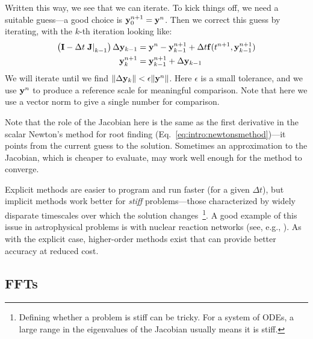 Written this way, we see that we can iterate.  To kick things off, we need
a suitable guess---a good choice is ${\bf y}^{n+1}_0 = {\bf y}^n$.   Then
we correct this guess by iterating, with the $k$-th iteration looking like:
\begin{align}
  \left ({\bf I} - \Delta t \left . {\bf J} \right |_{k-1} \right ) \Delta {\bf y}_{k-1} &=
        {\bf y}^n - {\bf y}_{k-1}^{n+1} + \Delta t {\bf f}(t^{n+1}, {\bf y}^{n+1}_{k-1}) \\
  {\bf y}^{n+1}_k &= {\bf y}^{n+1}_{k-1} + \Delta {\bf y}_{k-1}
\end{align}
We will iterate until we find $\| \Delta {\bf y}_k\| < \epsilon \|
{\bf y}^n \|$.  Here $\epsilon$ is a small tolerance, and we use ${\bf
  y}^n$ to produce a reference scale for meaningful comparison.  Note
that here we use a vector norm to give a single number for comparison.

Note that the role of the Jacobian here is the same as the first
derivative in the scalar Newton's method for root finding
(Eq.~\ref{eq:intro:newtonsmethod})---it points from the current guess
to the solution.  Sometimes an approximation to the Jacobian, which is
cheaper to evaluate, may work well enough for the method to converge.

Explicit methods are easier to program and run faster (for a given $
\Delta t$), but implicit methods work better for {\em stiff}
problems---those characterized by widely disparate timescales over
which the solution changes~\cite{byrnehindmarsh}\footnote{Defining
  whether a problem is stiff can be tricky.  For a system of ODEs, a
  large range in the eigenvalues of the Jacobian usually means it is
  stiff.}.  A good example of this issue in astrophysical problems is
with nuclear reaction networks (see, e.g., \cite{timmes_networks}).
As with the explicit case, higher-order methods exist that can provide
better accuracy at reduced cost.



\subsection{FFTs}




